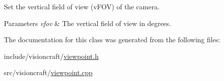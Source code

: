 Set the vertical field of view (v\+F\+OV) of the camera. 


\begin{DoxyParams}{Parameters}
{\em vfov} & The vertical field of view in degrees. \\
\hline
\end{DoxyParams}


The documentation for this class was generated from the following files\+:\begin{DoxyCompactItemize}
\item 
include/visioncraft/\hyperlink{viewpoint_8h}{viewpoint.\+h}\item 
src/visioncraft/\hyperlink{viewpoint_8cpp}{viewpoint.\+cpp}\end{DoxyCompactItemize}
